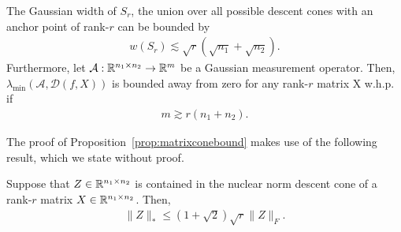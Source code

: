 \begin{proposition}\label{prop:matrixconebound}
    The Gaussian width of $S_r$, the union over all possible descent cones with an anchor point of rank-$r$ can be bounded by
    \begin{align*}
        w(S_r) 
        \lesssim \sqrt{r} \left( \sqrt{n_1} + \sqrt{n_2}\right).
    \end{align*}
    Furthermore, let $\mathcal{A}: \mathbb{R}^{n_1\times n_2}\rightarrow \mathbb{R}^m$ be a Gaussian measurement operator. Then, $\lambda_{\min} \left( \mathcal{A},  \mathcal{D}(f,X)\right)$ is bounded away from zero for any rank-$r$ matrix X w.h.p. if
    \begin{align*}
        m \gtrsim  r (n_1 + n_2).
    \end{align*}
\end{proposition}

The proof of Proposition~\ref{prop:matrixconebound} makes use of the following result, which we state without proof.
\begin{lemma}
\label{le:conerank}
Suppose that $Z \in \mathbb{R}^{n_1 \times n_2}$  is contained in the nuclear norm descent cone of a rank-$r$ matrix $X \in \mathbb{R}^{n_1 \times n_2}$. Then,
\begin{align*}
\|Z\|_* \leq  \left(1+\sqrt{2}\right) \sqrt{r}  \|Z\|_F.
\end{align*}
\end{lemma}


